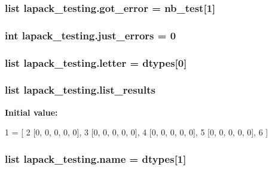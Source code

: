 \subsubsection[{got\+\_\+error}]{\setlength{\rightskip}{0pt plus 5cm}list lapack\+\_\+testing.\+got\+\_\+error = {\bf nb\+\_\+test}\mbox{[}1\mbox{]}}\label{namespacelapack__testing_a4923c7b5aecf9d46dcb4675addd06912}
\hypertarget{namespacelapack__testing_a67160254671ff72dd81a11526d5e2afc}{}
\subsubsection[{just\+\_\+errors}]{\setlength{\rightskip}{0pt plus 5cm}int lapack\+\_\+testing.\+just\+\_\+errors = 0}\label{namespacelapack__testing_a67160254671ff72dd81a11526d5e2afc}
\hypertarget{namespacelapack__testing_a308432f3e36aa01579924497617f2c4e}{}
\subsubsection[{letter}]{\setlength{\rightskip}{0pt plus 5cm}list lapack\+\_\+testing.\+letter = {\bf dtypes}\mbox{[}0\mbox{]}}\label{namespacelapack__testing_a308432f3e36aa01579924497617f2c4e}
\hypertarget{namespacelapack__testing_aad1e68d42e2240bfeccb55b8d60e9126}{}
\subsubsection[{list\+\_\+results}]{\setlength{\rightskip}{0pt plus 5cm}list lapack\+\_\+testing.\+list\+\_\+results}\label{namespacelapack__testing_aad1e68d42e2240bfeccb55b8d60e9126}
{\bfseries Initial value\+:}
\begin{DoxyCode}
1 = [
2 [0, 0, 0, 0, 0],
3 [0, 0, 0, 0, 0],
4 [0, 0, 0, 0, 0],
5 [0, 0, 0, 0, 0],
6 ]
\end{DoxyCode}
\hypertarget{namespacelapack__testing_ad7e315e0bd725f8cac7659735bb3e7f0}{}
\subsubsection[{name}]{\setlength{\rightskip}{0pt plus 5cm}list lapack\+\_\+testing.\+name = {\bf dtypes}\mbox{[}1\mbox{]}}\label{namespacelapack__testing_ad7e315e0bd725f8cac7659735bb3e7f0}
\hypertarget{namespacelapack__testing_a13eed2214e37dac5dfcccc85bb54e0ff}{}
